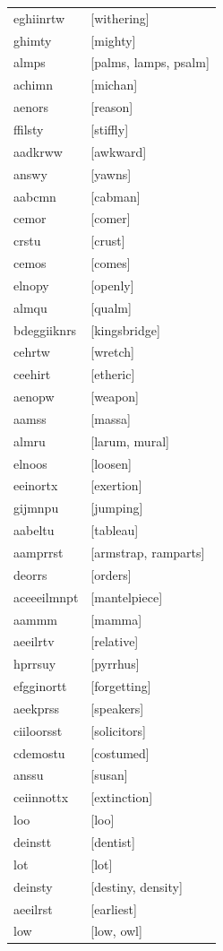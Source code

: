 \documentclass{article}
\begin{document}
\begin{tabular}{ll}
eghiinrtw & [withering] \\
ghimty & [mighty] \\
almps & [palms, lamps, psalm] \\
achimn & [michan] \\
aenors & [reason] \\
ffilsty & [stiffly] \\
aadkrww & [awkward] \\
answy & [yawns] \\
aabcmn & [cabman] \\
cemor & [comer] \\
crstu & [crust] \\
cemos & [comes] \\
elnopy & [openly] \\
almqu & [qualm] \\
bdeggiiknrs & [kingsbridge] \\
cehrtw & [wretch] \\
ceehirt & [etheric] \\
aenopw & [weapon] \\
aamss & [massa] \\
almru & [larum, mural] \\
elnoos & [loosen] \\
eeinortx & [exertion] \\
gijmnpu & [jumping] \\
aabeltu & [tableau] \\
aamprrst & [armstrap, ramparts] \\
deorrs & [orders] \\
aceeeilmnpt & [mantelpiece] \\
aammm & [mamma] \\
aeeilrtv & [relative] \\
hprrsuy & [pyrrhus] \\
efgginortt & [forgetting] \\
aeekprss & [speakers] \\
ciiloorsst & [solicitors] \\
cdemostu & [costumed] \\
anssu & [susan] \\
ceiinnottx & [extinction] \\
loo & [loo] \\
deinstt & [dentist] \\
lot & [lot] \\
deinsty & [destiny, density] \\
aeeilrst & [earliest] \\
low & [low, owl] \\

\end{tabular}
\end{document}
